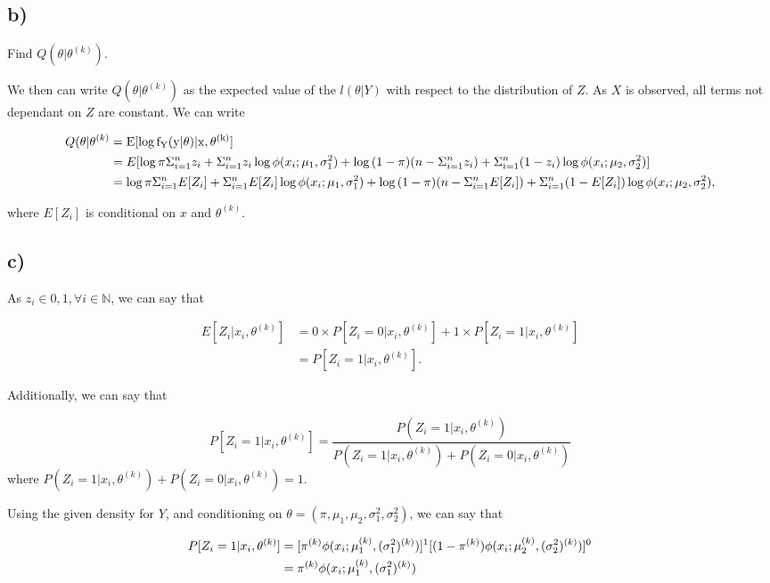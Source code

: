 \documentclass[]{article}
\begin{document}
\subsection{b)}\label{b-1}

Find \(Q(\theta|\theta^{(k)})\).

We then can write \(Q(\theta | \theta^{(k)})\) as the expected value of
the \(l(\theta | Y)\) with respect to the distribution of \(Z\). As
\(X\) is observed, all terms not dependant on \(Z\) are constant. We can
write

\begin{align*}
Q(\theta | \theta^{(k)} &= \rm{E}[\log f_Y(y|\theta) | x, \theta^{(k)}] \\
&= E[\log{\pi} \Sigma_{i=1}^{n} z_i + \Sigma_{i=1}^{n} z_i \log{\phi(x_i; \mu_{1}, \sigma_{1}^2)} + \log{(1-\pi)}(n - \Sigma_{i=1}^{n} z_i) + \Sigma_{i=1}^{n} (1 - z_i)\log{\phi(x_i; \mu_{2}, \sigma_{2}^2)}]\\ &= 
\log{\pi} \Sigma_{i=1}^{n} E[Z_i] + \Sigma_{i=1}^{n} E[Z_i] \log{\phi(x_i; \mu_{1}, \sigma_{1}^2)} + \log{(1-\pi)}(n - \Sigma_{i=1}^{n} E[Z_i]) + \Sigma_{i=1}^{n} (1 - E[Z_i])\log{\phi(x_i; \mu_{2}, \sigma_{2}^2)}, 
\end{align*}

where \(E[Z_i]\) is conditional on \(x\) and \(\theta^{(k)}\).

\subsection{c)}\label{c-1}

As \(z_i \in {0, 1}, \forall i \in \mathbb{N}\), we can say that

\begin{align*}
E[Z_i | x_i, \theta^{(k)}] &= 0 \times P[Z_i = 0 | x_i, \theta^{(k)}] + 1 \times P[Z_i = 1|x_i, \theta^{(k)}] \\
&= P[Z_i = 1|x_i, \theta^{(k)}].
\end{align*}

Additionally, we can say that

\[P[Z_i = 1|x_i, \theta^{(k)}] = \frac{P(Z_i=1| x_i, \theta^{(k)})}{P(Z_i=1 | x_i, \theta^{(k)}) + P(Z_i=0| x_i, \theta^{(k)})}
\] where
\({P(Z_i=1 | x_i, \theta^{(k)}) + P(Z_i=0| x_i, \theta^{(k)})} = 1\).

Using the given density for \(Y\), and conditioning on
\(\theta=(\pi, \mu_1, \mu_2, \sigma_1^2, \sigma_2^2)\), we can say that

\begin{align*}
P[Z_i = 1 | x_i, \theta^{(k)}] &= [\pi^{(k)}\phi(x_i; \mu_{1}^{(k)}, (\sigma_{1}^2)^{(k)})]^1 [(1- \pi^{(k)})\phi(x_i; \mu_{2}^{(k)}, (\sigma_{2}^2)^{(k)})]^{0} \\ &= \pi^{(k)}\phi(x_i; \mu_{1}^{(k)}, (\sigma_{1}^2)^{(k)})
\end{align*}
\end{document}
